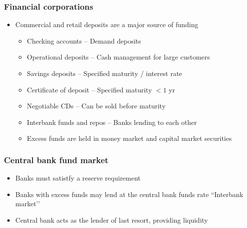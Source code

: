 \documentclass[../notes_compiled.tex]{subfiles}
\begin{document}
\subsubsection{Financial corporations}
\begin{itemize}
\item Commercial and retail deposits are a major source of funding
\begin{itemize}
\item Checking accounts -- Demand deposits
\item Operational deposits -- Cash management for large customers
\item Savings deposits -- Specified maturity / interest rate
\item Certificate of deposit -- Specified maturity $<1$ yr
\item Negotiable CDs -- Can be sold before maturity
\item Interbank funds and repos -- Banks lending to each other
\item[] Excess funds are held in money market and capital market securities
\end{itemize}
\end{itemize}

\subsubsection*{Central bank fund market}
\begin{itemize}
\item Banks must satistfy a reserve requirement
\item Banks with excess funds may lend at the central bank funds rate ``Interbank market’’
\item Central bank acts as the lender of last resort, providing liquidity
\end{itemize}
\end{document}
